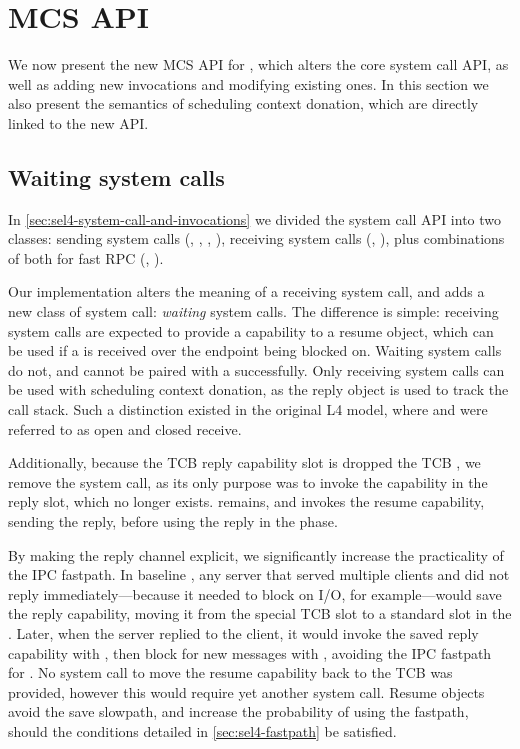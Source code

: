 \section{MCS API}
\label{s:new-api}

We now present the new \gls{MCS} API for \selfour, which alters the core system call API, 
as well as adding new invocations and modifying existing ones. In this section we also
present the semantics of scheduling context donation, which are directly linked to the new API.

\subsection{Waiting system calls}

In \cref{sec:sel4-system-call-and-invocations} we divided the \selfour system call API into two
classes: sending system calls (\send, \nbsend, \call, \reply),
receiving system calls (\recv, \nbrecv), plus combinations of both for fast 
RPC (\call, \replyrecv).  

Our implementation alters the meaning of a receiving system call, and adds a new class of system
call: \emph{waiting} system calls. The difference is simple: receiving system calls are expected to
provide a capability to a resume object, which can be used if a \call is received over
the endpoint being blocked on. Waiting system calls do not, and cannot be paired with a \call
successfully. Only receiving system calls can be used with scheduling context donation, as the reply
object is used to track the call stack. Such a distinction existed in the original L4 model, where
and were referred to as open and closed receive.

Additionally, because the TCB reply capability slot is dropped the \gls{TCB} \cnode, we remove the \reply 
system call, as its only purpose was to invoke the capability in the reply slot, which no longer exists.
\replyrecv remains, and invokes the resume capability, sending the reply, before using the
reply in the \recv phase. 

By making the reply channel explicit, we significantly increase the practicality of the IPC
fastpath. In baseline \selfour, any server that served multiple clients and did not reply
immediately---because it needed to block on I/O, for example---would save the reply
capability, moving it from the special TCB slot to a standard slot in the \cspace. Later, when
the server replied to the client, it would invoke the saved reply capability with \send, then block
for new messages with \recv, avoiding the IPC fastpath for \replyrecv. No system call to move the 
resume capability back to the \gls{TCB} \cnode was provided, however this would require yet another
system call. Resume objects avoid the save
slowpath, and increase the probability of using the fastpath, should the conditions detailed in \cref{sec:sel4-fastpath} be satisfied.

